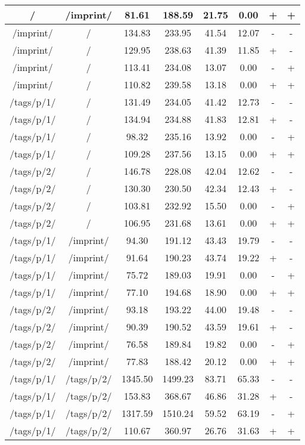 \begin{appendix}
\begin{center}
\begin{longtable}{cccccccc}
/ & /imprint/ & 81.61 & 188.59 & 21.75 & 0.00 & + & + \\
\hline
/imprint/ & / & 134.83 & 233.95 & 41.54 & 12.07 & - & - \\
/imprint/ & / & 129.95 & 238.63 & 41.39 & 11.85 & + & - \\
/imprint/ & / & 113.41 & 234.08 & 13.07 & 0.00 & - & + \\
/imprint/ & / & 110.82 & 239.58 & 13.18 & 0.00 & + & + \\
\hline
\hline
/tags/p/1/ & / & 131.49 & 234.05 & 41.42 & 12.73 & - & - \\
/tags/p/1/ & / & 134.94 & 234.88 & 41.83 & 12.81 & + & - \\
/tags/p/1/ & / & 98.32 & 235.16 & 13.92 & 0.00 & - & + \\
/tags/p/1/ & / & 109.28 & 237.56 & 13.15 & 0.00 & + & + \\
\hline
/tags/p/2/ & / & 146.78 & 228.08 & 42.04 & 12.62 & - & - \\
/tags/p/2/ & / & 130.30 & 230.50 & 42.34 & 12.43 & + & - \\
/tags/p/2/ & / & 103.81 & 232.92 & 15.50 & 0.00 & - & + \\
/tags/p/2/ & / & 106.95 & 231.68 & 13.61 & 0.00 & + & + \\
\hline
/tags/p/1/ & /imprint/ & 94.30 & 191.12 & 43.43 & 19.79 & - & - \\
/tags/p/1/ & /imprint/ & 91.64 & 190.23 & 43.74 & 19.22 & + & - \\
/tags/p/1/ & /imprint/ & 75.72 & 189.03 & 19.91 & 0.00 & - & + \\
/tags/p/1/ & /imprint/ & 77.10 & 194.68 & 18.90 & 0.00 & + & + \\
\hline
/tags/p/2/ & /imprint/ & 93.18 & 193.22 & 44.00 & 19.48 & - & - \\
/tags/p/2/ & /imprint/ & 90.39 & 190.52 & 43.59 & 19.61 & + & - \\
/tags/p/2/ & /imprint/ & 76.58 & 189.84 & 19.82 & 0.00 & - & + \\
/tags/p/2/ & /imprint/ & 77.83 & 188.42 & 20.12 & 0.00 & + & + \\
\hline
\hline
/tags/p/1/ & /tags/p/2/ & 1345.50 & 1499.23 & 83.71 & 65.33 & - & - \\
/tags/p/1/ & /tags/p/2/ & 153.83 & 368.67 & 46.86 & 31.28 & + & - \\
/tags/p/1/ & /tags/p/2/ & 1317.59 & 1510.24 & 59.52 & 63.19 & - & + \\
/tags/p/1/ & /tags/p/2/ & 110.67 & 360.97 & 26.76 & 31.63 & + & + \\

\end{longtable}
\end{center}
\end{appendix}
